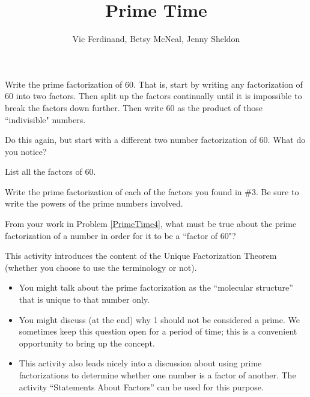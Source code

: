 \documentclass{ximera}
\title{Prime Time}
\author{Vic Ferdinand, Betsy McNeal, Jenny Sheldon}
\begin{document}
\begin{abstract} \end{abstract}
\maketitle



\begin{problem}
 Write the prime factorization of 60.  That is, start by writing any factorization of 60 into two factors.  Then split up the factors continually until it is impossible to break the factors down further.  Then write 60 as the product of those ``indivisible" numbers.
\end{problem} 
\begin{problem}
 Do this again, but start with a different two number factorization of 60.  What do you notice?
\end{problem} 
\begin{problem}
 List all the factors of 60.
\end{problem} 
\begin{problem}\label{PrimeTime4}
 Write the prime factorization of each of the factors you found in $\#$3.  Be sure to write the powers of the prime numbers involved.
\end{problem} 
\begin{problem}
 From your work in Problem \ref{PrimeTime4}, what must be true about the prime factorization of a number in order for it to be a ``factor of 60"? 
\end{problem} 


\newpage
\begin{instructorNotes}
This activity introduces the content of the Unique Factorization Theorem (whether you choose to use the terminology or not). 

\begin{itemize}
	\item You might talk about the prime factorization as the ``molecular structure'' that is unique to that number only.
	\item You might discuss (at the end) why 1 should not be considered a prime.  We sometimes keep this question open for a period of time; this is a convenient opportunity to bring up the concept.
	\item This activity also leads nicely into a discussion about using prime factorizations to determine whether one number is a factor of another. The activity ``Statements About Factors'' can be used for this purpose.
\end{itemize}
\end{instructorNotes}
\end{document}
